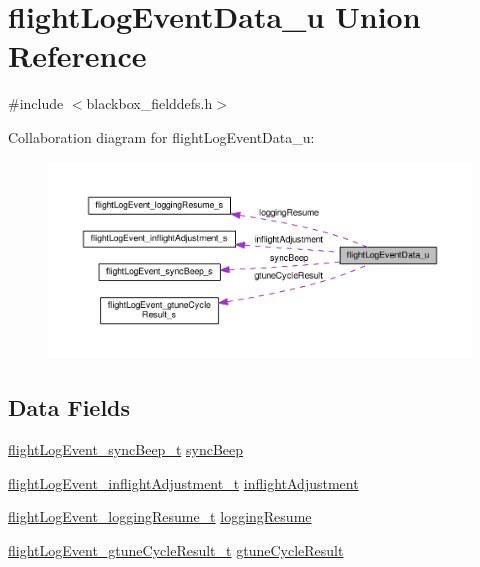 \hypertarget{unionflightLogEventData__u}{\section{flight\+Log\+Event\+Data\+\_\+u Union Reference}
\label{unionflightLogEventData__u}
}


{\ttfamily \#include $<$blackbox\+\_\+fielddefs.\+h$>$}



Collaboration diagram for flight\+Log\+Event\+Data\+\_\+u\+:\nopagebreak
\begin{figure}[H]
\begin{center}
\leavevmode
\includegraphics[width=350pt]{unionflightLogEventData__u__coll__graph}
\end{center}
\end{figure}
\subsection*{Data Fields}
\begin{DoxyCompactItemize}
\item 
\hyperlink{blackbox__fielddefs_8h_a96a970966afb15f21042c865ab4d89de}{flight\+Log\+Event\+\_\+sync\+Beep\+\_\+t} \hyperlink{unionflightLogEventData__u_a922156bcd08c3da3ab6eaacd3df80e42}{sync\+Beep}
\item 
\hyperlink{blackbox__fielddefs_8h_a3ac1e3383249f24d271fda4abc80e1db}{flight\+Log\+Event\+\_\+inflight\+Adjustment\+\_\+t} \hyperlink{unionflightLogEventData__u_a6b0fc6a89a094a79497121396898fe02}{inflight\+Adjustment}
\item 
\hyperlink{blackbox__fielddefs_8h_a85641ff18f1fca3d1361fc9ca33b008e}{flight\+Log\+Event\+\_\+logging\+Resume\+\_\+t} \hyperlink{unionflightLogEventData__u_a5f862be076776a00d12cc5623b9eae51}{logging\+Resume}
\item 
\hyperlink{blackbox__fielddefs_8h_a3a88e8abfce05d27844d49f0de7f34ce}{flight\+Log\+Event\+\_\+gtune\+Cycle\+Result\+\_\+t} \hyperlink{unionflightLogEventData__u_a165eb4e6ec232a3b73ab024928b0abfd}{gtune\+Cycle\+Result}
\end{DoxyCompactItemize}


